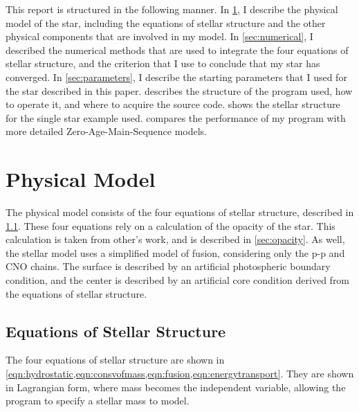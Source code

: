 \documentclass[10pt]{article}
\begin{document}
This report is structured in the following manner. In \cref{sec:physicalmodel}, I describe the physical model of the star, including the equations of stellar structure and the other physical components that are involved in my model. In \cref{sec:numerical}, I described the numerical methods that are used to integrate the four equations of stellar structure, and the criterion that I use to conclude that my star has converged. In \cref{sec:parameters}, I describe the starting parameters that I used for the star described in this paper.  describes the structure of the program used, how to operate it, and where to acquire the source code.  shows the stellar structure for the single star example used.  compares the performance of my program with more detailed Zero-Age-Main-Sequence models.

\section{Physical Model}\label{sec:physicalmodel}
The physical model consists of the four equations of stellar structure, described in \cref{sec:equations}. These four equations rely on a calculation of the opacity of the star. This calculation is taken from other's work, and is described in \cref{sec:opacity}. As well, the stellar model uses a simplified model of fusion, considering only the p-p and CNO chains. The surface is described by an artificial photospheric boundary condition, and the center is described by an artificial core condition derived from the equations of stellar structure.

\subsection{Equations of Stellar Structure} \label{sec:equations}
The four equations of stellar structure are shown in \cref{eqn:hydrostatic,eqn:consvofmass,eqn:fusion,eqn:energytransport}. They are shown in Lagrangian form, where mass becomes the independent variable, allowing the program to specify a stellar mass to model.
\end{document}
